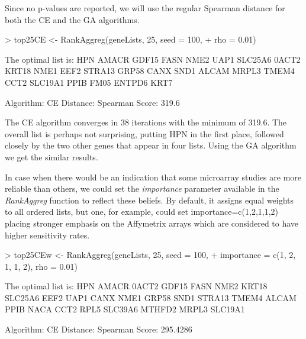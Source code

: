 \documentclass[11pt]{article}
\begin{document}
Since no p-values are reported, we will use the regular Spearman distance for both the CE and the GA algorithms.

\begin{Schunk}
\begin{Sinput}
> top25CE <- RankAggreg(geneLists, 25, seed = 100, 
+     rho = 0.01)
\end{Sinput}
\end{Schunk}

\begin{Schunk}
\begin{Soutput}
The optimal list is: 
        HPN AMACR GDF15 FASN NME2 UAP1 SLC25A6 0ACT2 KRT18 NME1
        EEF2 STRA13 GRP58 CANX SND1 ALCAM MRPL3 TMEM4 CCT2
        SLC19A1 PPIB FM05 ENTPD6 KRT7

  Algorithm:   CE
  Distance:    Spearman
  Score:       319.6 
\end{Soutput}
\end{Schunk}

The CE algorithm converges in 38 iterations with the minimum of 319.6. The overall list is perhaps not surprising, 
putting HPN in the first place, followed closely by the two other genes that appear in four lists. Using the GA
algorithm we get the similar results.

In case when there would be an indication that some microarray studies are more reliable than others, we could 
set the \emph{importance} parameter available in the \emph{RankAggreg} function to reflect these beliefs. By default,
it assigns equal weights to all ordered lists, but one, for example, could set importance=c(1,2,1,1,2) placing 
stronger emphasis on the Affymetrix arrays which are considered to have higher sensitivity rates.

\begin{Schunk}
\begin{Sinput}
> top25CEw <- RankAggreg(geneLists, 25, seed = 100, 
+     importance = c(1, 2, 1, 1, 2), rho = 0.01)
\end{Sinput}
\end{Schunk}

\begin{Schunk}
\begin{Soutput}
The optimal list is: 
        HPN AMACR 0ACT2 GDF15 FASN NME2 KRT18 SLC25A6 EEF2 UAP1
        CANX NME1 GRP58 SND1 STRA13 TMEM4 ALCAM PPIB NACA CCT2
        RPL5 SLC39A6 MTHFD2 MRPL3 SLC19A1

  Algorithm:   CE
  Distance:    Spearman
  Score:       295.4286 
\end{Soutput}
\end{Schunk}
\end{document}
